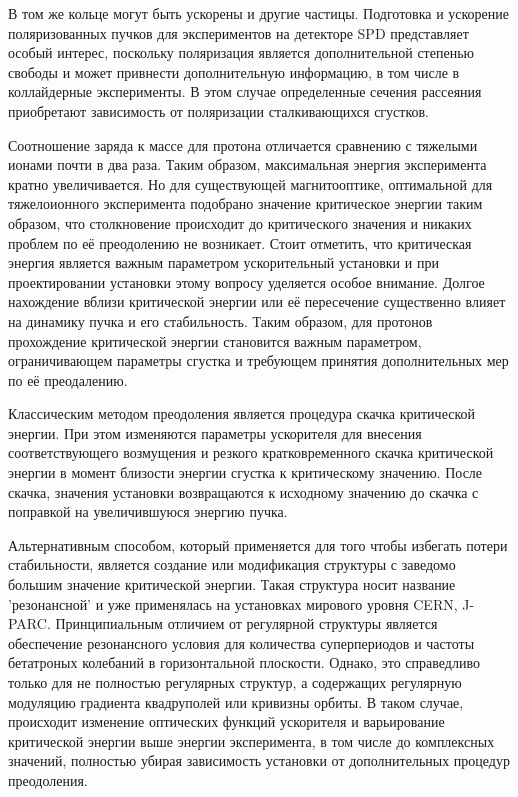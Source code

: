 \par В том же кольце могут быть ускорены и другие частицы. Подготовка и ускорение поляризованных пучков для экспериментов на детекторе SPD представляет особый интерес, поскольку поляризация является дополнительной степенью свободы и может привнести дополнительную информацию, в том числе в коллайдерные эксперименты. В этом случае определенные сечения рассеяния приобретают зависимость от поляризации сталкивающихся сгустков.

\par Соотношение заряда к массе для протона отличается сравнению с тяжелыми ионами почти в два раза. Таким образом, максимальная энергия эксперимента кратно увеличивается. Но для существующей магнитооптике, оптимальной для тяжелоионного эксперимента подобрано значение критическое энергии таким образом, что столкновение происходит до критического значения и никаких проблем по её преодолению не возникает. Стоит отметить, что критическая энергия является важным параметром ускорительный установки и при проектировании установки этому вопросу уделяется особое внимание. Долгое нахождение вблизи критической энергии или её пересечение существенно влияет на динамику пучка и его стабильность. Таким образом, для протонов прохождение критической энергии становится важным параметром, ограничивающем параметры сгустка и требующем принятия дополнительных мер по её преодалению.

\par Классическим методом преодоления является процедура скачка критической энергии. При этом изменяются параметры ускорителя для внесения соответствующего возмущения и резкого кратковременного скачка критической энергии в момент близости энергии сгустка к критическому значению. После скачка, значения установки возвращаются к исходному значению до скачка с поправкой на увеличившуюся энергию пучка.

\par Альтернативным способом, который применяется для того чтобы избегать потери стабильности, является создание или модификация структуры с заведомо большим значение критической энергии. Такая структура носит название 'резонансной' и уже применялась на установках мирового уровня CERN, J-PARC. Принципиальным отличием от регулярной структуры является обеспечение резонансного условия для количества суперпериодов и частоты бетатроных колебаний в горизонтальной плоскости. Однако, это справедливо только для не полностью регулярных структур, а содержащих регулярную модуляцию градиента квадруполей или кривизны орбиты. В таком случае, происходит изменение оптических функций ускорителя и варьирование критической энергии выше энергии эксперимента, в том числе до комплексных значений, полностью убирая зависимость установки от дополнительных процедур преодоления.

